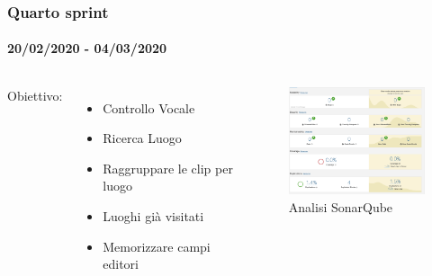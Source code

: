 \documentclass{beamer}
\begin{document}
\begin{frame}
\frametitle{Quarto sprint}
\framesubtitle{20/02/2020 - 04/03/2020}
\begin{columns}
Obiettivo:
  \begin{itemize}
	\item Controllo Vocale
	\item Ricerca Luogo
	\item Raggruppare le clip per luogo
	\item Luoghi già visitati
	\item Memorizzare campi editori
  \end{itemize}
	\begin{figure}[h]
	\centering
        \includegraphics[width=5cm]{Images/SonarQube/ultimo-sprint.png}
        \caption{Analisi SonarQube}
   \end{figure}
\end{columns}
\end{frame}

\end{document}
